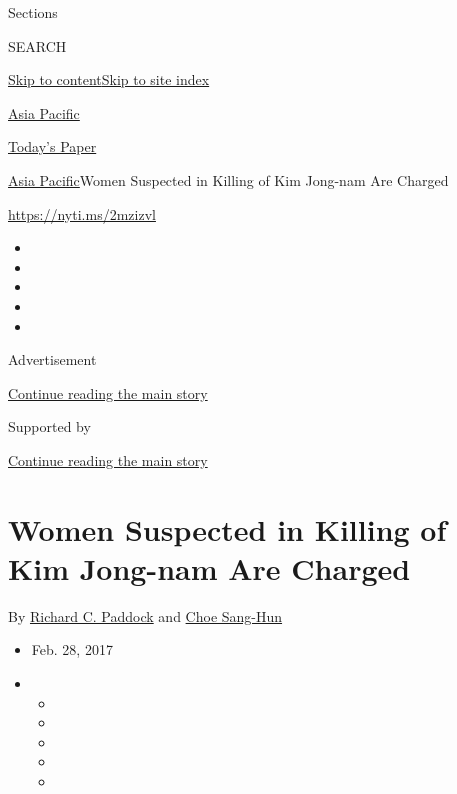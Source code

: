 Sections

SEARCH

\protect\hyperlink{site-content}{Skip to
content}\protect\hyperlink{site-index}{Skip to site index}

\href{https://www.nytimes.com/section/world/asia}{Asia Pacific}

\href{https://myaccount.nytimes.com/auth/login?response_type=cookie\&client_id=vi}{}

\href{https://www.nytimes.com/section/todayspaper}{Today's Paper}

\href{/section/world/asia}{Asia Pacific}\textbar{}Women Suspected in
Killing of Kim Jong-nam Are Charged

\url{https://nyti.ms/2mzizvl}

\begin{itemize}
\item
\item
\item
\item
\item
\end{itemize}

Advertisement

\protect\hyperlink{after-top}{Continue reading the main story}

Supported by

\protect\hyperlink{after-sponsor}{Continue reading the main story}

\hypertarget{women-suspected-in-killing-of-kim-jong-nam-are-charged}{%
\section{Women Suspected in Killing of Kim Jong-nam Are
Charged}\label{women-suspected-in-killing-of-kim-jong-nam-are-charged}}

By \href{https://www.nytimes.com/by/richard-c-paddock}{Richard C.
Paddock} and \href{http://www.nytimes.com/by/choe-sang-hun}{Choe
Sang-Hun}

\begin{itemize}
\item
  Feb. 28, 2017
\item
  \begin{itemize}
  \item
  \item
  \item
  \item
  \item
  \end{itemize}
\end{itemize}

